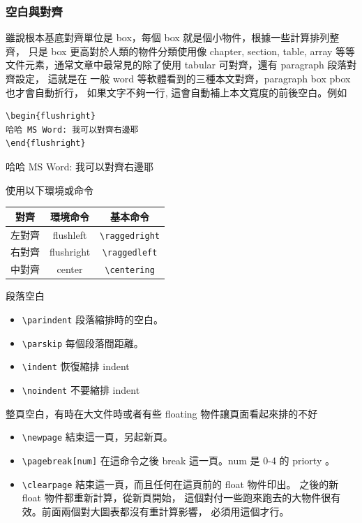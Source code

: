     \subsubsection{空白與對齊}
    雖說根本基底對齊單位是 box，每個 box 就是個小物件，根據一些計算排列整齊，
    只是 box 更高對於人類的物件分類使用像 chapter, section, table, array 等等
    文件元素，通常文章中最常見的除了使用 tabular 可對齊，還有 paragraph 段落對
    齊設定， 這就是在 一般 word 等軟體看到的三種本文對齊，paragraph box pbox
    也才會自動折行， 如果文字不夠一行, 這會自動補上本文寬度的前後空白。例如
    \begin{verbatim}
\begin{flushright}
哈哈 MS Word: 我可以對齊右邊耶
\end{flushright}
    \end{verbatim}
    \begin{flushright}
    哈哈 MS Word: 我可以對齊右邊耶
    \end{flushright}
    使用以下環境或命令
    \begin{center}
      \begin{tabular}{ccc}
        對齊 & 環境命令  & 基本命令\\
        \hline
        左對齊 & flushleft & \verb=\raggedright= \\
        右對齊 & flushright & \verb=\raggedleft= \\
        中對齊 & center & \verb=\centering= \\
      \end{tabular}
    \end{center}
    段落空白
    \begin{itemize}
      \item \verb=\parindent= 段落縮排時的空白。
      \item \verb=\parskip= 每個段落間距離。
      \item \verb=\indent= 恢復縮排 indent
      \item \verb=\noindent= 不要縮排 indent
    \end{itemize}
    整頁空白，有時在大文件時或者有些 floating 物件讓頁面看起來排的不好
    \begin{itemize}
      \item \verb=\newpage= 結束這一頁，另起新頁。
      \item \verb=\pagebreak[num]= 在這命令之後  break 這一頁。num 是 0-4 的
        priorty 。
      \item \verb=\clearpage= 結束這一頁，而且任何在這頁前的 float 物件印出。
        之後的新 float 物件都重新計算，從新頁開始，
        這個對付一些跑來跑去的大物件很有效。前面兩個對大圖表都沒有重計算影響，
        必須用這個才行。
    \end{itemize}

